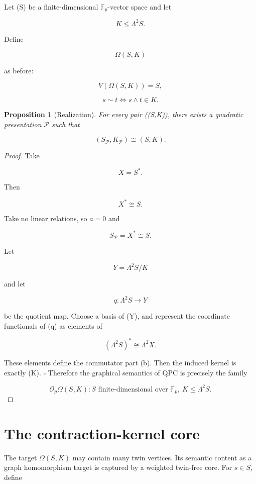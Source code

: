 \documentclass[11pt]{article}
\newtheorem{proposition}[theorem]{Proposition}
\begin{document}
Let (S) be a finite-dimensional $\mathbb F_p$-vector space and let

\[
K\le \Lambda^2S.
\]

Define

\[
\Omega(S,K)
\]

as before:

\[
V(\Omega(S,K))=S,
\]

\[
s\sim t
\iff s\wedge t\in K.
\]

\begin{proposition}[Realization]
For every pair ((S,K)), there exists a quadratic presentation $\mathcal P$ such that

\[
(S_\mathcal P,K_\mathcal P)\cong(S,K).
\]

\end{proposition}

\begin{proof}
Take

\[
X=S^*.
\]

Then

\[
X^*\cong S.
\]

Take no linear relations, so $a=0$ and

\[
S_\mathcal P=X^*\cong S.
\]

Let

\[
Y=\Lambda^2S/K
\]

and let

\[
q:\Lambda^2S\to Y
\]

be the quotient map. Choose a basis of (Y), and represent the coordinate functionals of (q) as elements of

\[
(\Lambda^2S)^*\cong \Lambda^2X.
\]

These elements define the commutator part (b). Then the induced kernel is exactly (K). $\square$ Therefore the graphical semantics of QPC is precisely the family

\[
\mathcal O_p
{\Omega(S,K): S\text{ finite-dimensional over }\mathbb F_p,\ K\le\Lambda^2S}.
\]

\end{proof}

\section{The contraction-kernel core}

The target $\Omega(S,K)$ may contain many twin vertices. Its semantic content as a graph homomorphism target is captured by a weighted twin-free core. For $s\in S$, define
\end{document}
